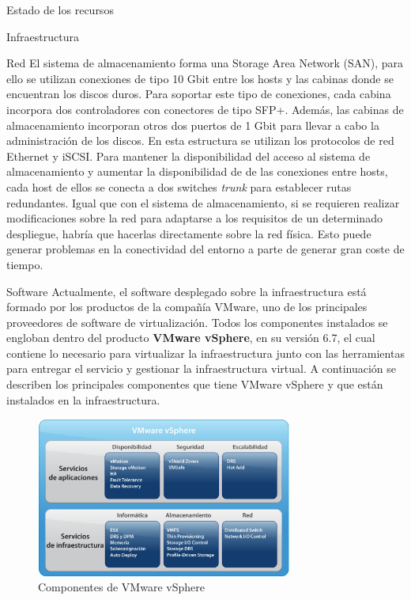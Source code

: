 \begin{chapter}{Estado de los recursos}
\begin{section}{Infraestructura}
\begin{subsection}{Red}
    El sistema de almacenamiento forma una Storage Area Network (SAN), para ello se utilizan conexiones de tipo 10 Gbit entre los hosts y las cabinas donde se encuentran los discos duros. Para soportar este tipo de conexiones, cada cabina incorpora dos controladores con conectores de tipo SFP+. Además, las cabinas de almacenamiento incorporan otros dos puertos de 1 Gbit para llevar a cabo la administración de los discos. En esta estructura se utilizan los protocolos de red Ethernet y iSCSI. Para mantener la disponibilidad del acceso al sistema de almacenamiento y aumentar la disponibilidad de de las conexiones entre hosts, cada host de ellos se conecta a dos switches \textit{trunk} para establecer rutas redundantes.
    Igual que con el sistema de almacenamiento, si se requieren realizar modificaciones sobre la red para adaptarse a los requisitos de un determinado despliegue, habría que hacerlas directamente sobre la red física. Esto puede generar problemas en la conectividad del entorno a parte de generar gran coste de tiempo.

\end{subsection}

\end{section}

\begin{section}{Software}
    \label{subsec:softwareinstalado}
    Actualmente, el software desplegado sobre la infraestructura está formado por los productos de la compañía VMware, uno de los principales proveedores de software de virtualización. Todos los componentes instalados se engloban dentro del producto \textbf{VMware vSphere}, en su versión 6.7, el cual contiene lo necesario para virtualizar la infraestructura junto con las herramientas para entregar el servicio y gestionar la infraestructura virtual. A continuación	se describen los principales componentes que tiene VMware vSphere y que están instalados en la infraestructura.
    \begin{figure}[h]
        \centering
        \includegraphics[width=0.75\textwidth]{imaxes/cap2recursos/contentVSphere}
        \caption{Componentes de VMware vSphere\cite{fotovSphere}}
        \label{fig:vSphere-components}
      \end{figure}
    

\end{section}
\end{chapter}
